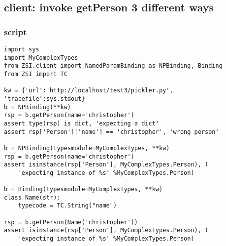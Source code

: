 \subsection{client: invoke getPerson 3 different ways}
\subsubsection{script}
\begin{verbatim}
import sys
import MyComplexTypes
from ZSI.client import NamedParamBinding as NPBinding, Binding
from ZSI import TC

kw = {'url':'http://localhost/test3/pickler.py', 'tracefile':sys.stdout}
b = NPBinding(**kw)
rsp = b.getPerson(name='christopher')
assert type(rsp) is dict, 'expecting a dict'
assert rsp['Person']['name'] == 'christopher', 'wrong person'

b = NPBinding(typesmodule=MyComplexTypes, **kw)
rsp = b.getPerson(name='christopher')
assert isinstance(rsp['Person'], MyComplexTypes.Person), (
    'expecting instance of %s' %MyComplexTypes.Person)

b = Binding(typesmodule=MyComplexTypes, **kw)
class Name(str):
    typecode = TC.String("name")

rsp = b.getPerson(Name('christopher'))
assert isinstance(rsp['Person'], MyComplexTypes.Person), (
    'expecting instance of %s' %MyComplexTypes.Person)
\end{verbatim} 

